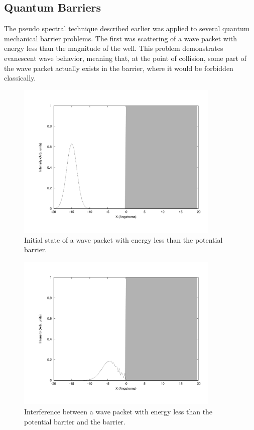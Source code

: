 \documentclass[12pt]{article}
\begin{document}
\subsection{Quantum Barriers}
The pseudo spectral technique described earlier was applied to several quantum mechanical barrier problems.  The first was scattering of a wave packet with energy less than the magnitude of the well.  This problem demonstrates evanescent wave behavior, meaning that, at the point of collision, some part of the wave packet actually exists in the barrier, where it would be forbidden classically.
\begin{figure}[!h]
\centering
\includegraphics[width =120 mm, height = 75mm]{Ex_7_21_start.pdf}
\caption{Initial state of a wave packet with energy less than the potential barrier.}
\label{fig:721s}
\end{figure}
\begin{figure}[!h]
\centering
\includegraphics[width =120 mm, height = 75mm]{Ex_7_21_end.pdf}
\caption{Interference between a wave packet with energy less than the potential barrier and the barrier.}
\label{fig:721e}
\end{figure}
\end{document}

